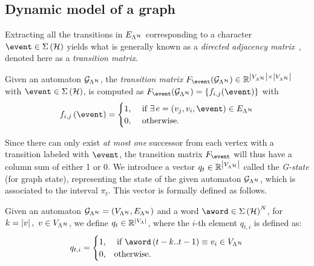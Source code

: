 \subsection{Dynamic model of a graph}
\label{ssec:dynamicgraph}

Extracting all the transitions in $E_{\Lambda^{\mathcal{H}}}$ corresponding to a character $\event \in \Sigma\left(\strat\right)$ yields what is generally known as a \emph{directed adjacency matrix}~\cite{xu2012matrix}, denoted here as a \emph{transition matrix}.
\begin{definition}%
    \label{def:transition}%
    Given an automaton $\mathcal{G}_{\Lambda^{\mathcal{H}}}$, the \emph{transition matrix} $F_{\event} ( \GG{\Lambda^\strat} ) \in \R^{\abs{\VV{\Lambda^\strat}} \times \abs{\VV{\Lambda^\strat}}}$ with $\event\in\Sigma\left(\strat\right)$, is computed as $F_{\event} ( \GG{\Lambda^\strat} ) = \{f_{i,j}(\event)\}$ with
    \begin{equation*}
        f_{i,j}\funof{\event}=
        \begin{cases}
            1, &\text{ if } \exists \, e=(v_j,v_i,\event) \in \EE{\Lambda^\strat} \\
            0, &\text{ otherwise.}
        \end{cases}
        \end{equation*}%
\end{definition}
%
Since there can only exist \emph{at most one} successor from each vertex with a transition labeled with $\event$, the transition matrix $F_\event$ will thus have a column sum of either 1 or 0.
We introduce a vector $q_t\in \mathbb{R}^{\left|V_{\Lambda^{\mathcal{H}}}\right|}$ called the \emph{G-state} (for graph state), representing the state of the given automaton $\mathcal{G}_{\Lambda^{\mathcal{H}}}$, which is associated to the interval $\pi_t$.
This vector is formally defined as follows.
\begin{definition}[G-state $q_t$]%
    \label{def:qt}%
    Given an automaton $\mathcal{G}_{\Lambda^{\mathcal{H}}} = (V_{\Lambda^{\mathcal{H}}}, E_{\Lambda^{\mathcal{H}}})$ and a word $\aword \in \Sigma\left( \strat \right)^N$, for $k = \left|v\right|,\,\, v\in V_{\Lambda^{\mathcal{H}}}$, we define $q_t\in \mathbb{R}^{\left|V_{\Lambda}\right|}$, where the $i$-th element $q_{t,i}$ is defined as:
    \begin{equation*}
        q_{t,i}=
        \begin{cases}
            1, &\text{ if } \aword\left(t-k..t-1\right) \equiv v_i \in \VV{\Lambda^\strat} \\
            0, &\text{otherwise}.
        \end{cases}
    \end{equation*}
\end{definition}
